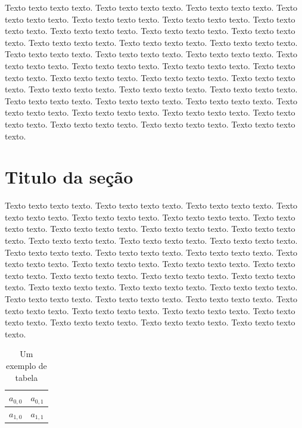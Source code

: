 \documentclass[a4paper, 12pt]{article}
\begin{document}
Texto texto texto texto. Texto texto texto texto. Texto texto texto texto. Texto texto texto texto.
Texto texto texto texto. Texto texto texto texto. Texto texto texto texto. Texto texto texto texto.
Texto texto texto texto. Texto texto texto texto. Texto texto texto texto. Texto texto texto texto.
Texto texto texto texto. Texto texto texto texto. Texto texto texto texto. Texto texto texto texto.
Texto texto texto texto. Texto texto texto texto. Texto texto texto texto. Texto texto texto texto.
Texto texto texto texto. Texto texto texto texto. Texto texto texto texto. Texto texto texto texto.
Texto texto texto texto. Texto texto texto texto. Texto texto texto texto. Texto texto texto texto.
Texto texto texto texto. Texto texto texto texto. Texto texto texto texto. Texto texto texto texto.
Texto texto texto texto. Texto texto texto texto. Texto texto texto texto. Texto texto texto texto.

\section{Titulo da seção}

Texto texto texto texto. Texto texto texto texto. Texto texto texto texto. Texto texto texto texto.
Texto texto texto texto. Texto texto texto texto. Texto texto texto texto. Texto texto texto texto.
Texto texto texto texto. Texto texto texto texto. Texto texto texto texto. Texto texto texto texto.
Texto texto texto texto. Texto texto texto texto. Texto texto texto texto. Texto texto texto texto.
Texto texto texto texto. Texto texto texto texto. Texto texto texto texto. Texto texto texto texto.
Texto texto texto texto. Texto texto texto texto. Texto texto texto texto. Texto texto texto texto.
Texto texto texto texto. Texto texto texto texto. Texto texto texto texto. Texto texto texto texto.
Texto texto texto texto. Texto texto texto texto. Texto texto texto texto. Texto texto texto texto.
Texto texto texto texto. Texto texto texto texto. Texto texto texto texto. Texto texto texto texto.

\begin{table}[htb]
	\centering
	\begin{tabular}{|c|c|}
		\hline
		$a_{0, 0}$ & $a_{0, 1}$ \\ \hline
		$a_{1, 0}$ & $a_{1, 1}$ \\ \hline
	\end{tabular}
	\caption{Um exemplo de tabela}
	\label{ex-tabela}
\end{table}
\end{document}
